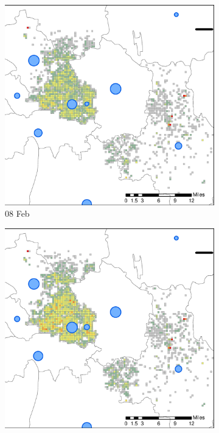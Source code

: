 \documentclass[preprints,ijgi,submit,moreauthors]{Definitions/mdpi}
\begin{document}
\begin{figure}[H]
    \vspace{6pt}
    \begin{subfigure}{.23\textwidth}
        \includegraphics[width=\textwidth]{Figures/Figure7/NewDistrictSSBD2020_02_08.eps}
        \caption{08 Feb}
    \end{subfigure}
    \begin{subfigure}{.23\textwidth}
        \includegraphics[width=\textwidth]{Figures/Figure7/NewDistrictSSBD2020_02_12.eps}

\end{subfigure}
\end{figure}
\end{document}
